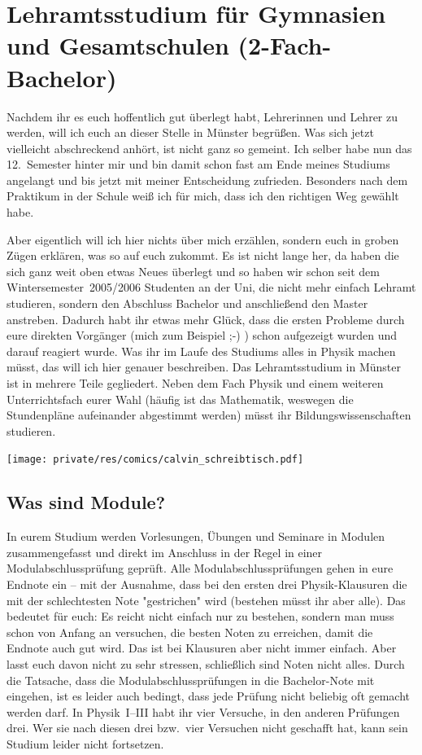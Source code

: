 \section[Lehramtsstudium für Gymnasien \& Gesamtschulen (2-Fach-Bachelor)]{Lehramtsstudium für Gymnasien und Gesamtschulen (2-Fach-Bachelor)}
\begin{multicols*}{2}
Nachdem ihr es euch hoffentlich gut überlegt habt, Lehrerinnen und Lehrer zu werden, will ich euch an dieser Stelle in Münster begrüßen.
Was sich jetzt vielleicht abschreckend anhört, ist nicht ganz so gemeint.
Ich selber habe nun das 12.~Semester hinter mir und bin damit schon fast am Ende meines Studiums angelangt und bis jetzt mit meiner Entscheidung zufrieden.
Besonders nach dem Praktikum in der Schule weiß ich für mich, dass ich den richtigen Weg gewählt habe.

Aber eigentlich will ich hier nichts über mich erzählen, sondern euch in groben Zügen erklären, was so auf euch zukommt.
Es ist nicht lange her, da haben die sich ganz weit oben etwas Neues überlegt und so haben wir schon seit dem Wintersemester~2005/2006 Studenten an der Uni, die nicht mehr einfach Lehramt studieren, sondern den Abschluss Bachelor und anschließend den Master anstreben.
Dadurch habt ihr etwas mehr Glück, dass die ersten Probleme durch eure direkten Vorgänger (mich zum Beispiel ;-) ) schon aufgezeigt wurden und darauf reagiert wurde.
Was ihr im Laufe des Studiums alles in Physik machen müsst, das will ich hier genauer beschreiben.
Das Lehramtsstudium in Münster ist in mehrere Teile gegliedert.
Neben dem Fach Physik und einem weiteren Unterrichtsfach eurer Wahl (häufig ist das Mathematik, weswegen die Stundenpläne aufeinander abgestimmt werden) müsst ihr Bildungswissenschaften studieren.

\begin{center}
	\texttt{[image: private/res/comics/calvin\_schreibtisch.pdf]}
\end{center}

\subsection{Was sind Module?}
In eurem Studium werden Vorlesungen, Übungen und Seminare in Modulen zusammengefasst und direkt im Anschluss in der Regel in einer Modulabschlussprüfung geprüft.
Alle Modulabschlussprüfungen gehen in eure Endnote ein -- mit der Ausnahme, dass bei den ersten drei Physik-Klausuren die mit der schlechtesten Note "gestrichen" wird (bestehen müsst ihr aber alle).
Das bedeutet für euch: Es reicht nicht einfach nur zu bestehen, sondern man muss schon von Anfang an versuchen, die besten Noten zu erreichen, damit die Endnote auch gut wird.
Das ist bei Klausuren aber nicht immer einfach.
Aber lasst euch davon nicht zu sehr stressen, schließlich sind Noten nicht alles.
Durch die Tatsache, dass die Modulabschlussprüfungen in die Bachelor-Note mit eingehen, ist es leider auch bedingt, dass jede Prüfung nicht beliebig oft gemacht werden darf.
In Physik~I--III habt ihr vier Versuche, in den anderen Prüfungen drei.
Wer sie nach diesen drei bzw.\ vier Versuchen nicht geschafft hat, kann sein Studium leider nicht fortsetzen.


\end{multicols*}
